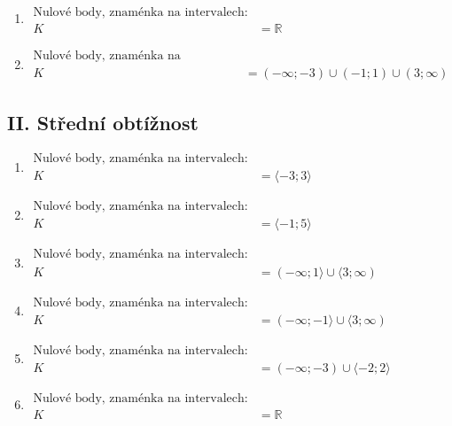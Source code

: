 \documentclass[11pt,a4paper]{article}
\begin{document}
\begin{enumerate}[label={},itemsep=9pt]
\item[\textbf{H013}] \(\displaystyle \begin{aligned}\text{Nulové body, znaménka na intervalech:}\\ K&=\mathbb R\end{aligned}\)\par
\item[\textbf{H015}] \(\displaystyle \begin{aligned}\text{Nulové body, znaménka na intervalech:}\\ K&=(-\infty;-3)\cup(-1;1)\cup(3;\infty)\end{aligned}\)\par
\end{enumerate}
\subsection*{II. Střední obtížnost}
\begin{enumerate}[label={},itemsep=9pt]
\item[\textbf{H002}] \(\displaystyle \begin{aligned}\text{Nulové body, znaménka na intervalech:}\\ K&=\langle-3;3\rangle\end{aligned}\)\par
\item[\textbf{H003}] \(\displaystyle \begin{aligned}\text{Nulové body, znaménka na intervalech:}\\ K&=\langle-1;5\rangle\end{aligned}\)\par
\item[\textbf{H007}] \(\displaystyle \begin{aligned}\text{Nulové body, znaménka na intervalech:}\\ K&=(-\infty;1\rangle\cup\langle3;\infty)\end{aligned}\)\par
\item[\textbf{H008}] \(\displaystyle \begin{aligned}\text{Nulové body, znaménka na intervalech:}\\ K&=(-\infty;-1\rangle\cup\langle3;\infty)\end{aligned}\)\par
\item[\textbf{H010}] \(\displaystyle \begin{aligned}\text{Nulové body, znaménka na intervalech:}\\ K&=(-\infty;-3)\cup\langle-2;2\rangle\end{aligned}\)\par
\item[\textbf{H014}] \(\displaystyle \begin{aligned}\text{Nulové body, znaménka na intervalech:}\\ K&=\mathbb R\end{aligned}\)\par
\end{enumerate}
\end{document}
